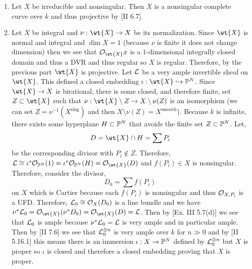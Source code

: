 \documentclass[12pt]{article}
\begin{document}
\begin{enumerate}
\item Let $X$ be irreducible and nonsingular. Then $X$ is a nonsingular complete curve over $k$ and thus projective by [II 6.7]. 

\item Let $X$ be integral and $\nu : \wt{X} \to X$ be its normalization. Since $\wt{X}$ is normal and integral and $\dim{X} = 1$ (because $\nu$ is finite it does not change dimension) then we see that $\struct{\wt{X}}{x}$ is a $1$-dimensional integrally closed domain and thus a DVR and thus regular so $X$ is regular. Therefore, by the previous part $\wt{X}$ is projective. Let $\L$ be a very ample invertible sheaf on $\wt{X}$. This defined a closed embedding $\iota : \wt{X} \embed \P^N$. Since $\wt{X} \to X$ is birational, there is some closed, and therefore finite, set $Z \subset \wt{X}$ such that $\nu : \wt{X} \setminus Z \to X \setminus \nu(Z)$ is an isomorphism (we can set $Z = \nu^{-1}(X^{\text{sing}})$ and then $X \setminus \nu(Z) = X^{\text{smooth}}$). Because $k$ is infinite, there exists some hyperplane $H \subset \P^N$ that avoids the finite set $Z \subset \P^N$. Let,
\[ D = \wt{X} \cap H = \sum P_i \]
be the corresponding divisor with $P_i \notin Z$. Therefore, $\L \cong \iota^* \struct{\P^H}(1) = \iota^* \struct{\P^N}(H) = \struct{\wt{X}}(D)$ and $f(P_i) \in X$ is nonsingular. Therefore, consider the divisor,
\[ D_0 = \sum f(P_i) \]
on $X$ which is Cartier because each $f(P_i)$ is nonsingular and thus $\stalk{X}{P_i}$ is a UFD. Therefore, $\L_0 \cong \struct{X}(D_0)$ is a line bundle and we have $\nu^* \L_0 = \struct{\wt{X}}(\nu^* D_0) = \struct{\wt{X}}(D) = \L$. Then by [Ex. III 5.7(d)] we see that $\L_0$ is ample because $\nu^* \L_0 = \L$ is very ample and in particular ample. Then by [II 7.6] we see that $\L_0^{\ot n}$ is very ample over $k$ for $n \gg 0$ and by [II 5.16.1] this means there is an immersion $\iota : X \to \P^N$ defined by $\L_0^{\ot n}$ but $X$ is proper so $\iota$ is closed and therefore a closed embedding proving that $X$ is proper.


\end{enumerate}
\end{document}
